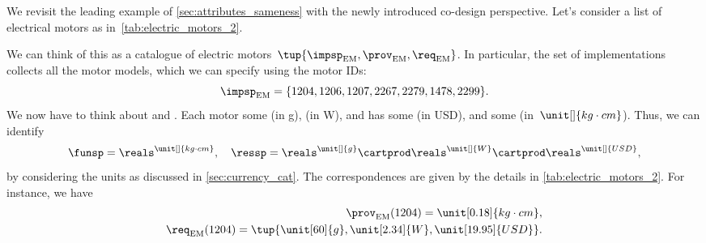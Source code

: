 \begin{example}
    \label{exa:dpi_elmotor}
    We revisit the leading example of \cref{sec:attributes_sameness} with the newly introduced co-design perspective.
    Let's consider a list of electrical motors as in~\cref{tab:electric_motors_2}.
    \begin{table*}[h]
        \centering
        \caption{A simplified catalogue of motors.}
        \label{tab:electric_motors_2}
    \end{table*}
    
    We can think of this as a catalogue of electric motors~$\tup{\impsp_\mathrm{EM},\prov_\mathrm{EM},\req_\mathrm{EM}}$.
    In particular, the set of implementations collects all the motor models, which we can specify using the motor IDs:
    \begin{equation}
        \impsp_\mathrm{EM}=\{1204,1206,1207,2267,2279,1478,2299 \}.
    \end{equation}
    We now have to think about  and .
    Each motor  some  (in \unit[]{g}),  (in \unit[]{W}), and has some  (in USD), and  some  (in~$\unit[]{kg\cdot cm}$).
    Thus, we can identify
    \begin{equation*}
        \funsp =\reals^{\unit[]{kg\cdot cm}},\quad \ressp=\reals^{\unit[]{g}}\cartprod \reals^{\unit[]{W}}\cartprod \reals^{\unit[]{USD}},
    \end{equation*}
    by considering the units as discussed in \cref{sec:currency_cat}.
    The correspondences are given by the details in \cref{tab:electric_motors_2}.
    For instance, we have
    \begin{align}
        \prov_\mathrm{EM}(1204)=\unit[0.18]{kg\cdot cm}, \\ \req_\mathrm{EM}(1204)=\tup{\unit[60]{g},\unit[2.34]{W},\unit[19.95]{USD}}.
    \end{align}
    

\end{example}

